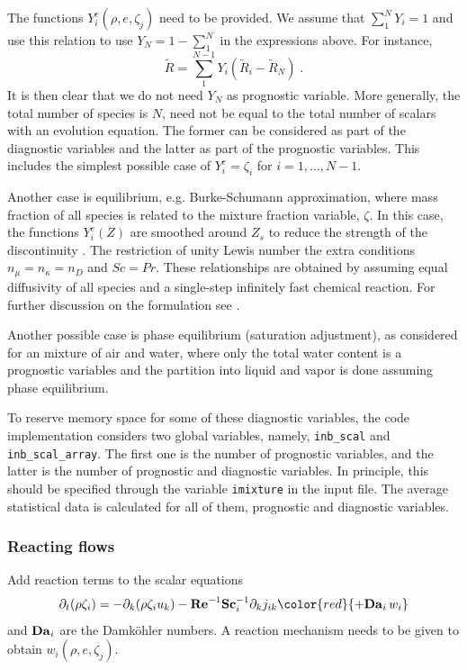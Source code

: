 The functions $Y_i^e(\rho,e,\zeta_j)$ need to be provided. We assume that $\sum_1^NY_i=1$ and use this relation to use $Y_N=1-\sum_1^N$ in the expressions above. For instance,
\begin{equation}
    \tilde{R}=\sum_1^{N-1}Y_i(\tilde{R}_i-\tilde{R}_N) \;.
\end{equation}
It is then clear that we do not need $Y_N$ as prognostic variable. More generally, the total number of species is $N$, need not be equal to the total number of scalars with an evolution equation. The former can be considered as part of the diagnostic variables and the latter as part of the prognostic variables. This includes the simplest possible case of $Y_i^e = \zeta_i$ for $i=1,\ldots,N-1$. 

Another case is equilibrium, e.g. Burke-Schumann approximation, where mass fraction of all species is related to the mixture fraction variable, $\zeta$.  In this case, the functions $Y_i^e(Z)$ are smoothed around $Z_s$ to reduce the strength of the discontinuity \citep{Higuera:1994}. The restriction of unity Lewis number the extra conditions $n_\mu=n_\kappa=n_D$ and $Sc=Pr$. These relationships are obtained by assuming equal diffusivity of all species and a single-step infinitely fast chemical reaction.  For further discussion on the formulation see \cite{Williams:1985}.

Another possible case is phase equilibrium (saturation adjustment), as considered for an mixture of air and water, where only the total water content is a prognostic variables and the partition into liquid and vapor is done assuming phase equilibrium. 

To reserve memory space for some of these diagnostic variables, the code implementation considers two global variables, namely, {\tt inb\_scal} and {\tt inb\_scal\_array}. The first one is the number of prognostic variables, and the latter is the number of prognostic and diagnostic variables. In principle, this should be specified through the variable {\tt imixture} in the input file. The average statistical data is calculated for all of them, prognostic and diagnostic variables.

\subsubsection{Reacting flows}

Add reaction terms to the scalar equations
\begin{equation}
    \partial_t (\rho \zeta_i)= -\partial_k (\rho \zeta_i u_k)
    - \mathrm{\bf Re}^{-1}\mathrm{\bf Sc}_i^{-1} \partial_k j_{ik} \color{red}{+\Da_i\,w_i}
\end{equation}
and $\mathrm{\bf Da}_i$ are the Damk{\"o}hler numbers. A reaction mechanism needs to be given to obtain $w_i(\rho,e,\zeta_j)$.

